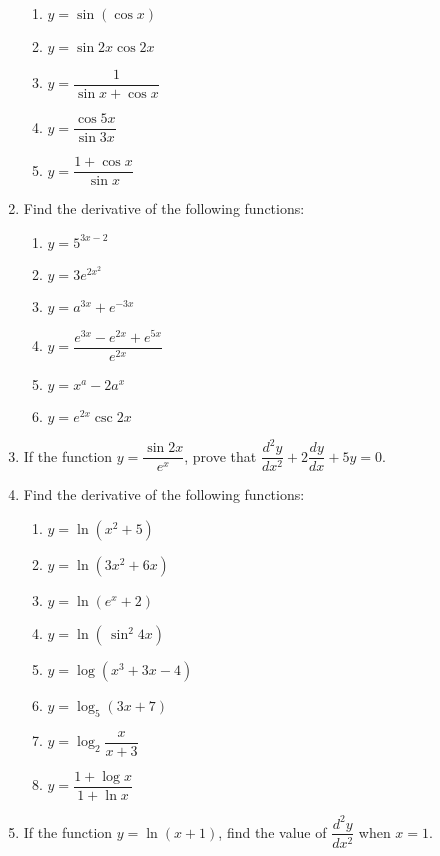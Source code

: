 \documentclass[12pt]{report}
\begin{document}
\begin{enumerate}
\begin{enumerate}
              \item $y=\sin\left(\cos x\right)$
              \item $y=\sin2x\cos2x$
              \item $y={\dfrac{1}{\sin x+\cos x}}$
              \item $y={\dfrac{\cos 5x}{\sin 3x}}$
              \item $y={\dfrac{1+\cos x}{\sin x}}$
          \end{enumerate}
    \item Find the derivative of the following functions:
          \begin{enumerate}
              \item $y=5^{3x-2}$
              \item $y=3e^{2x^{2}}$
              \item $y=a^{3x}+e^{-3x}$
              \item $y={\dfrac{e^{3x}-e^{2x}+e^{5x}}{e^{2x}}}$
              \item $y=x^{a}-2a^{x}$
              \item $y=e^{2x}\csc2x$
          \end{enumerate}
    \item If the function $y = \dfrac{\sin 2x}{e^x}$, prove that $\dfrac{d^2y}{dx^2} +
              2\dfrac{dy}{dx} + 5y = 0$.
    \item Find the derivative of the following functions:
          \begin{enumerate}
              \item $y=\ln\left(x^{2}+5\right)$
              \item $y=\ln\left(3x^{2}+6x\right)$
              \item $y=\ln\left(e^{x}+2\right)$
              \item $y=\ln\left(\,\sin^{2}4x\right)$
              \item $y=\log\left(x^{3}+3x-4\right)$
              \item $y=\log_{5}\left(3x+7\right)$
              \item $y=\log_{2}{\dfrac{x}{x+3}}$
              \item $y={\dfrac{1+\log x}{1+\ln x}}$
          \end{enumerate}
    \item If the function $y = \ln(x+1)$, find the value of $\dfrac{d^2y}{dx^2}$ when $x
              = 1$.
\end{enumerate}
\end{document}
